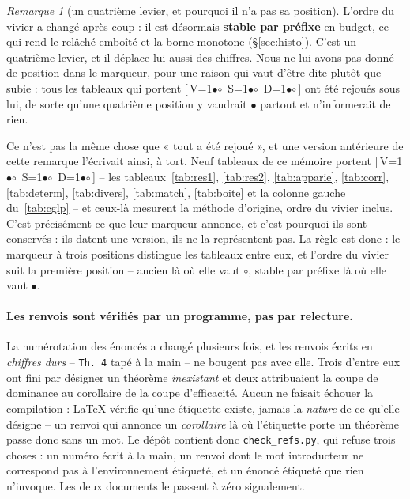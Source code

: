 \documentclass[11pt,a4paper]{article}
\theoremstyle{plain}
\theoremstyle{remark}
\newtheorem{remark}{Remarque}
\newcommand{\cfgm}[1]{\ifnum#1=1$\bullet$\else$\circ$\fi}
\newcommand{\conf}[3]{%
  \textsf{\footnotesize[\,V\cfgm{#1}\ S\cfgm{#2}\ D\cfgm{#3}\,]}}
\begin{document}
\begin{remark}[un quatrième levier, et pourquoi il n'a pas sa position]
\label{rem:quatrieme}
L'ordre du vivier a changé après coup : il est désormais \textbf{stable par
préfixe} en budget, ce qui rend le relâché emboîté et la borne monotone
(§\ref{sec:histo}). C'est un quatrième levier, et il déplace lui aussi des
chiffres. Nous ne lui avons pas donné de position dans le marqueur, pour une
raison qui vaut d'être dite plutôt que subie : tous les tableaux qui
portent \conf{1}{1}{1} ont été rejoués sous lui, de sorte qu'une quatrième
position y vaudrait $\bullet$ partout et n'informerait de rien.

Ce n'est pas la même chose que « tout a été rejoué », et une version
antérieure de cette remarque l'écrivait ainsi, à tort. Neuf tableaux de ce
mémoire portent \conf{0}{0}{0} -- les tableaux~\ref{tab:res1},
\ref{tab:res2}, \ref{tab:apparie}, \ref{tab:corr}, \ref{tab:determ},
\ref{tab:divers}, \ref{tab:match}, \ref{tab:boite} et la colonne gauche
du~\ref{tab:cglp} -- et ceux-là mesurent la méthode d'origine, ordre du
vivier inclus. C'est précisément ce que leur marqueur annonce, et c'est
pourquoi ils sont conservés : ils datent une version, ils ne la
représentent pas. La règle est donc : le marqueur à trois positions
distingue les tableaux entre eux, et l'ordre du vivier suit la première
position -- ancien là où elle vaut $\circ$, stable par préfixe là où elle
vaut $\bullet$.
\end{remark}


\paragraph{Les renvois sont vérifiés par un programme, pas par relecture.}
La numérotation des énoncés a changé plusieurs fois, et les renvois écrits
en \emph{chiffres durs} -- \texttt{Th.\ 4} tapé à la main -- ne bougent pas
avec elle. Trois
d'entre eux ont fini par désigner un théorème \emph{inexistant} et deux
attribuaient la coupe de dominance au corollaire de la coupe d'efficacité.
Aucun ne faisait échouer la compilation : \LaTeX{} vérifie qu'une étiquette
existe, jamais la \emph{nature} de ce qu'elle désigne -- un renvoi qui
annonce un \emph{corollaire} là où l'étiquette porte un théorème passe donc
sans un mot. Le dépôt contient
donc \texttt{check\_refs.py}, qui refuse trois choses : un numéro écrit à la
main, un renvoi dont le mot introducteur ne correspond pas à
l'environnement étiqueté, et un énoncé étiqueté que rien n'invoque. Les deux
documents le passent à zéro signalement.
\end{document}
